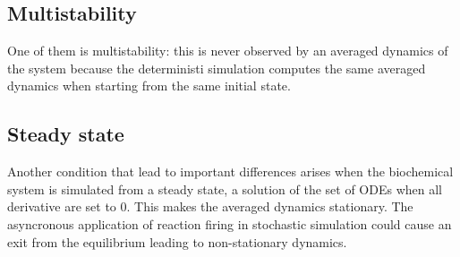   \subsection{Multistability}
  One of them is multistability: this is never observed by an averaged dynamics of the system because the deterministi simulation computes the same averaged dynamics when starting from the same initial state.

  \subsection{Steady state}
  Another condition that lead to important differences arises when the biochemical system is simulated from a steady state, a solution of the set of ODEs when all derivative are set to $0$.
  This makes the averaged dynamics stationary.
  The asyncronous application of reaction firing in stochastic simulation could cause an exit from the equilibrium leading to non-stationary dynamics.
